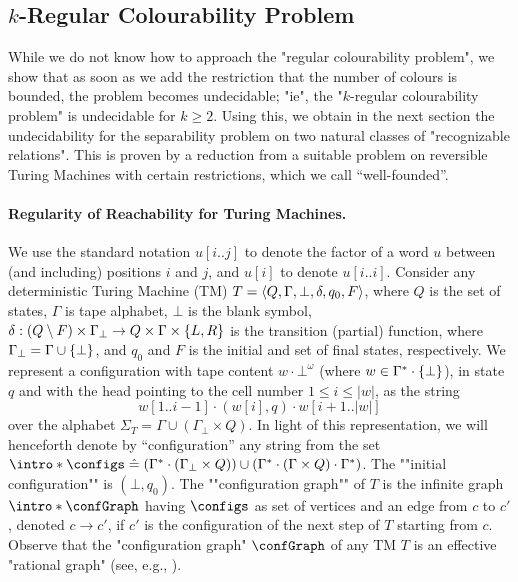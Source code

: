 \subsection{$k$-Regular Colourability Problem}

While we do not know how to approach the "regular colourability problem", we show that as soon as we add the restriction that the number of colours is bounded, the problem becomes undecidable;
"ie", the "$k$-regular colourability problem" is undecidable for $k\geq 2$. Using this, we obtain in the next section 
the undecidability for the separability problem on two natural classes of 
"recognizable relations". This is proven by a reduction from a suitable problem on reversible 
Turing Machines with certain restrictions, which we call ``well-founded''.

\paragraph*{Regularity of Reachability for Turing Machines.}
We use the standard notation $u[i..j]$ to denote the factor of a word $u$ between (and including) positions $i$ and $j$, and $u[i]$ to denote $u[i..i]$.
Consider any deterministic Turing Machine (TM) $T = \langle Q,\Gamma,\bot,\delta,q_0,F\rangle$, where $Q$ is the set of states, $\Gamma$ is tape alphabet, $\bot$ is the blank symbol, $\delta: (Q \setminus F) \times \Gamma_\bot \to Q \times \Gamma \times \{L,R\}$ is the transition (partial) function, where $\Gamma_\bot = \Gamma \cup \{\bot\}$, and $q_0$ and $F$ is the initial and set of final states, respectively.
%
We represent a configuration with tape content $w \cdot \bot^\omega$ (where $w \in \Gamma^* \cdot \{\bot\}$), in state $q$ and with the head pointing to the cell number $1 \leq i \leq |w|$, as the string
\[
   w[1..i-1] \cdot (w[i],q) \cdot w[i+1..|w|] 
\]
over the alphabet $\Sigma_T = \Gamma \cup (\Gamma_\bot \times Q)$.
\AP In light of this representation, we will henceforth denote by ``configuration'' any string from the set  $\intro*\configs \defeq (\Gamma^* \cdot (\Gamma_\bot \times Q)) \cup  (\Gamma^* \cdot (\Gamma \times Q) \cdot \Gamma^*)$. The ""initial configuration"" is $(\bot,q_0)$.
\AP The ""configuration graph"" of $T$ is the infinite graph $\intro*\confGraph$ having $\configs$ as set of vertices and an edge from $c$ to $c'$, denoted $c \rightarrow c'$, if $c'$ is the configuration of the next step of $T$ starting from $c$. Observe that the "configuration graph" $\confGraph$ of any TM $T$ is an effective "rational graph" (see, e.g., \cite{KuskeLohrey2010AutomaticGraphs}).

